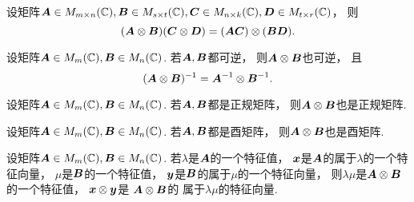 \begin{lemma}
设矩阵\(\boldsymbol{A} \in M_{m \times n}(\mathbb{C}),
\boldsymbol{B} \in M_{s \times t}(\mathbb{C}),
\boldsymbol{C} \in M_{n \times k}(\mathbb{C}),
\boldsymbol{D} \in M_{t \times r}(\mathbb{C})\)，
则\begin{equation}
	(\boldsymbol{A}\otimes\boldsymbol{B})
	(\boldsymbol{C}\otimes\boldsymbol{D})
	= (\boldsymbol{A}\boldsymbol{C})\otimes(\boldsymbol{B}\boldsymbol{D}).
\end{equation}
\end{lemma}

\begin{property}
设矩阵\(\boldsymbol{A} \in M_m(\mathbb{C}),
\boldsymbol{B} \in M_n(\mathbb{C})\).
若\(\boldsymbol{A},\boldsymbol{B}\)都可逆，
则\(\boldsymbol{A}\otimes\boldsymbol{B}\)也可逆，
且\begin{equation}
	(\boldsymbol{A}\otimes\boldsymbol{B})^{-1}
	= \boldsymbol{A}^{-1}\otimes\boldsymbol{B}^{-1}.
\end{equation}
\end{property}

\begin{property}
设矩阵\(\boldsymbol{A} \in M_m(\mathbb{C}),
\boldsymbol{B} \in M_n(\mathbb{C})\).
若\(\boldsymbol{A},\boldsymbol{B}\)都是正规矩阵，
则\(\boldsymbol{A}\otimes\boldsymbol{B}\)也是正规矩阵.
\end{property}

\begin{property}
设矩阵\(\boldsymbol{A} \in M_m(\mathbb{C}),
\boldsymbol{B} \in M_n(\mathbb{C})\).
若\(\boldsymbol{A},\boldsymbol{B}\)都是酉矩阵，
则\(\boldsymbol{A}\otimes\boldsymbol{B}\)也是酉矩阵.
\end{property}

\begin{property}
设矩阵\(\boldsymbol{A} \in M_m(\mathbb{C}),
\boldsymbol{B} \in M_n(\mathbb{C})\).
若\(\lambda\)是\(\boldsymbol{A}\)的一个特征值，
\(\boldsymbol{x}\)是\(\boldsymbol{A}\)的属于\(\lambda\)的一个特征向量，
\(\mu\)是\(\boldsymbol{B}\)的一个特征值，
\(\boldsymbol{y}\)是\(\boldsymbol{B}\)的属于\(\mu\)的一个特征向量，
则\(\lambda\mu\)是\(\boldsymbol{A}\otimes\boldsymbol{B}\)的一个特征值，
\(\boldsymbol{x}\otimes\boldsymbol{y}\)是
\(\boldsymbol{A}\otimes\boldsymbol{B}\)的
属于\(\lambda\mu\)的特征向量.
\end{property}

